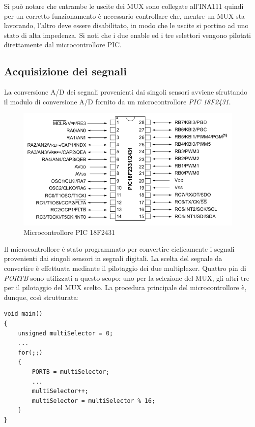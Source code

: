 \documentclass[12pt,a4paper,oneside,openright,italian]{article}
\begin{document}
Si pu\`o notare che entrambe le uscite dei MUX sono collegate all'INA111 quindi per un corretto funzionamento \`e necessario controllare che, mentre un MUX sta lavorando, l'altro deve essere disabilitato, in modo che le uscite si portino ad uno stato di alta impedenza. Si noti che i due enable ed i tre selettori vengono pilotati direttamente dal microcontrollore PIC.


\newpage
\subsection{Acquisizione dei segnali}
La conversione A/D dei segnali provenienti dai singoli sensori avviene sfruttando il modulo di conversione A/D fornito da un microcontrollore \emph{PIC 18F2431}\cite{18f2431}.
\begin{figure}[!hbp]
  \centering
  \includegraphics[width=390pt]{immagini/18f2431.png}
  \caption{Microcontrollore PIC 18F2431}
  \label{18f2431}
\end{figure}

Il microcontrollore \`e stato programmato per convertire ciclicamente i segnali provenienti dai singoli sensori in segnali digitali. La scelta del segnale da convertire \`e effettuata mediante il pilotaggio dei due multiplexer. Quattro pin di \emph{PORTB} sono utilizzati a questo scopo: uno per la selezione del MUX, gli altri tre per il pilotaggio del MUX scelto. La procedura principale del microcontrollore \`e, dunque, cos\`i strutturata:

\begin{lstlisting}[caption={Procedura principale del microcontrollore}, label={code:struct},frame=trBL]
void main()
{
	unsigned multiSelector = 0;
	...
	for(;;)
	{
		PORTB = multiSelector;
		...
		multiSelector++;
		multiSelector = multiSelector % 16;
	}	
}
\end{lstlisting}
\end{document}
